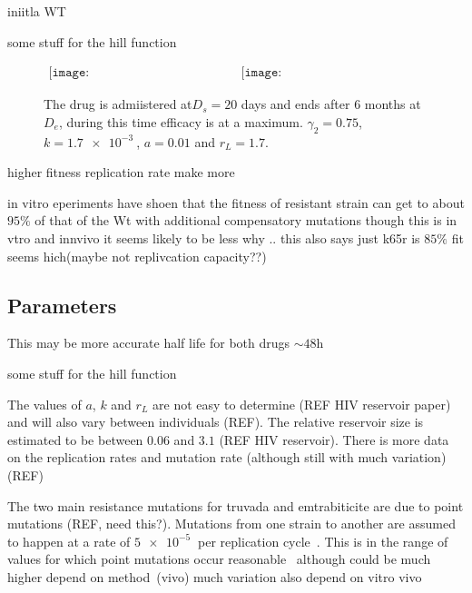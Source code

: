 \documentclass[DIV=15]{scrartcl}
\begin{document}
 
 iniitla WT

some stuff for the hill function~\cite{shirreff2011}
~\cite{hollingsworth2008}


\begin{figure*}[h]
 \begin{center}$
 \begin{array}{cc}
 \texttt{[image: InHostActDLabel\_17-06a.eps]} &
 \texttt{[image: InHostResDLabel\_17-06a.eps]} 
 \end{array}$
 \end{center}
 \caption{The drug is admiistered at$D_s = 20$ days and ends after $6$ months at $D_e$, during this time efficacy is at a maximum. $\gamma_2=0.75$, $k=\SI{1.7e-3}{}$, $a = 0.01$ and $r_L = 1.7$.  }
 \label{within host example}
 \end{figure*}

higher fitness replication rate make more   
  
  
  
  in vitro  eperiments have shoen that the  fitness of resistant strain can get to about $95\%$ of that of the Wt with additional compensatory mutations though this is in vtro and innvivo it seems likely to be less why .. this also says just k65r is $85\%$ fit seems hich(maybe not replivcation capacity??)~\cite{Svarovskaia2008}
  
  
\subsection{Parameters}
\label{Parameters}


 This may be more accurate half life for both drugs $\sim 48$h~\cite{patterson2011}
 
 

some stuff for the hill function~\cite{shirreff2011}
~\cite{hollingsworth2008}



The values of $a$, $k$ and $r_L$ are not easy to determine (REF HIV reservoir paper)
and will also vary between individuals (REF). The relative reservoir size is estimated to be between $0.06$ and $3.1$ (REF HIV reservoir). There is more data on the replication rates and mutation rate (although still with much variation) (REF)

The two main resistance mutations for truvada and emtrabiticite are due to point mutations (REF, need this?). Mutations from one strain to another are assumed to happen at a rate of $\SI{5e-5}{}$ per replication cycle~\cite{gao2004}. This is in the range of values for which point mutations occur reasonable~\cite{abram2010}
although could be much higher depend on method~\cite{cuevas2015}(vivo) much variation also depend on vitro vivo
\end{document}
